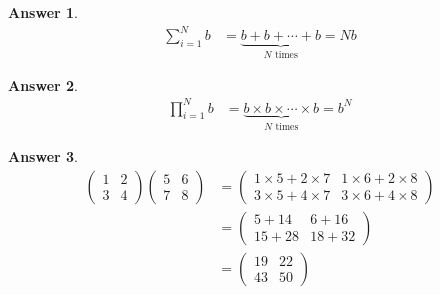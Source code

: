 \documentclass{article}
\newtheorem{answer}{Answer}
\begin{document}
\begin{answer}
  \begin{align}
    \sum_{i=1}^N b &= \underbrace{b + b + \dotsm + b}_{N \text{ times}} = N b
  \end{align}
\end{answer}

\begin{answer}
  \begin{align}
    \prod_{i=1}^N b &= \underbrace{b \times b \times \dotsm \times b}_{N \text{ times}} = b^N
  \end{align}
\end{answer}

\begin{answer}
  \begin{align}
    \begin{pmatrix}
      1 & 2 \\
      3 & 4
    \end{pmatrix}
    \begin{pmatrix}
      5 & 6 \\
      7 & 8
    \end{pmatrix}
    &= 
    \begin{pmatrix}
      1 \times 5 + 2 \times 7 & 1 \times 6 + 2 \times 8\\
      3 \times 5 + 4 \times 7 & 3 \times 6 + 4 \times 8
    \end{pmatrix}\\
    &= 
    \begin{pmatrix}
      5 + 14 & 6 + 16\\
      15 + 28 & 18 + 32
    \end{pmatrix}\\
    &=
    \begin{pmatrix}
      19 & 22\\
      43 & 50
    \end{pmatrix}
  \end{align}
\end{answer}
\end{document}
